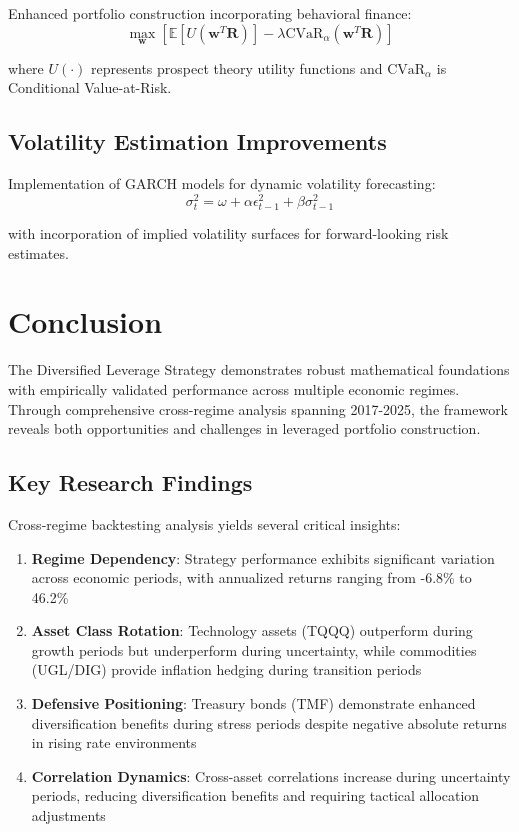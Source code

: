 \documentclass[onecolumn,11pt]{IEEEtran}
\begin{document}
Enhanced portfolio construction incorporating behavioral finance:
\begin{equation}
\max_{\mathbf{w}} \left[ \mathbb{E}[U(\mathbf{w}^T \mathbf{R})] - \lambda \text{CVaR}_\alpha(\mathbf{w}^T \mathbf{R}) \right]
\end{equation}

where $U(\cdot)$ represents prospect theory utility functions and $\text{CVaR}_\alpha$ is Conditional Value-at-Risk.

\subsection{Volatility Estimation Improvements}

Implementation of GARCH models for dynamic volatility forecasting:
\begin{equation}
\sigma_t^2 = \omega + \alpha \epsilon_{t-1}^2 + \beta \sigma_{t-1}^2
\end{equation}

with incorporation of implied volatility surfaces for forward-looking risk estimates.

\section{Conclusion}

The Diversified Leverage Strategy demonstrates robust mathematical foundations with empirically validated performance across multiple economic regimes. Through comprehensive cross-regime analysis spanning 2017-2025, the framework reveals both opportunities and challenges in leveraged portfolio construction.

\subsection{Key Research Findings}

Cross-regime backtesting analysis yields several critical insights:

\begin{enumerate}
    \item \textbf{Regime Dependency}: Strategy performance exhibits significant variation across economic periods, with annualized returns ranging from -6.8\% to 46.2\%
    \item \textbf{Asset Class Rotation}: Technology assets (TQQQ) outperform during growth periods but underperform during uncertainty, while commodities (UGL/DIG) provide inflation hedging during transition periods
    \item \textbf{Defensive Positioning}: Treasury bonds (TMF) demonstrate enhanced diversification benefits during stress periods despite negative absolute returns in rising rate environments
    \item \textbf{Correlation Dynamics}: Cross-asset correlations increase during uncertainty periods, reducing diversification benefits and requiring tactical allocation adjustments
\end{enumerate}
\end{document}
